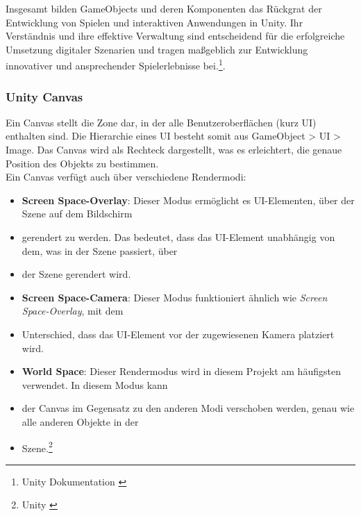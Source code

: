 Insgesamt bilden GameObjects und deren Komponenten das Rückgrat der Entwicklung von Spielen und interaktiven Anwendungen in
Unity. Ihr Verständnis und ihre effektive Verwaltung sind entscheidend für die erfolgreiche Umsetzung digitaler Szenarien
und tragen maßgeblich zur Entwicklung innovativer und ansprechender Spielerlebnisse bei.\footnote{Unity Dokumentation \cite{GameObjects}}.


\subsubsection{Unity Canvas} 
Ein Canvas stellt die Zone dar, in der alle Benutzeroberflächen (kurz UI) enthalten sind. Die Hierarchie eines UI besteht
somit aus GameObject > UI > Image. Das Canvas wird als Rechteck dargestellt, was es erleichtert, die genaue Position des
Objekts zu bestimmen.\\
Ein Canvas verfügt auch über verschiedene Rendermodi:
\begin{itemize}

    \item\textbf{Screen Space-Overlay}: Dieser Modus ermöglicht es UI-Elementen, über der Szene auf dem Bildschirm
    \item gerendert zu werden. Das bedeutet, dass das UI-Element unabhängig von dem, was in der Szene passiert, über
    \item der Szene gerendert wird.

    \item\textbf{Screen Space-Camera}: Dieser Modus funktioniert ähnlich wie \textit{Screen Space-Overlay}, mit dem
    \item Unterschied, dass das UI-Element vor der zugewiesenen Kamera platziert wird.

    \item\textbf{World Space}: Dieser Rendermodus wird in diesem Projekt am häufigsten verwendet. In diesem Modus kann
    \item der Canvas im Gegensatz zu den anderen Modi verschoben werden, genau wie alle anderen Objekte in der
    \item Szene.\protect\footnote{Unity \cite{Canvas}}
\end{itemize}



